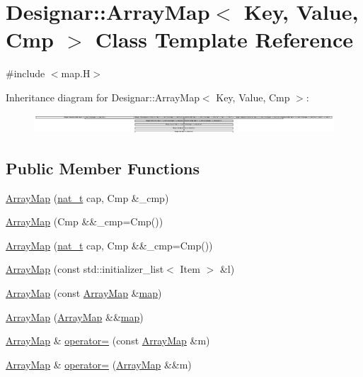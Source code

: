 \hypertarget{class_designar_1_1_array_map}{}\section{Designar\+:\+:Array\+Map$<$ Key, Value, Cmp $>$ Class Template Reference}
\label{class_designar_1_1_array_map}


{\ttfamily \#include $<$map.\+H$>$}

Inheritance diagram for Designar\+:\+:Array\+Map$<$ Key, Value, Cmp $>$\+:\begin{figure}[H]
\begin{center}
\leavevmode
\includegraphics[height=0.724638cm]{class_designar_1_1_array_map}
\end{center}
\end{figure}
\subsection*{Public Member Functions}
\begin{DoxyCompactItemize}
\item 
\hyperlink{class_designar_1_1_array_map_aa08404c6d0b6d40d7aefd04ccea24bc5}{Array\+Map} (\hyperlink{namespace_designar_aa72662848b9f4815e7bf31a7cf3e33d1}{nat\+\_\+t} cap, Cmp \&\+\_\+cmp)
\item 
\hyperlink{class_designar_1_1_array_map_ac7113b782b6ade75f5ccc843ecc2c153}{Array\+Map} (Cmp \&\&\+\_\+cmp=Cmp())
\item 
\hyperlink{class_designar_1_1_array_map_a553f96874d7e4037c333edd6dd76ba31}{Array\+Map} (\hyperlink{namespace_designar_aa72662848b9f4815e7bf31a7cf3e33d1}{nat\+\_\+t} cap, Cmp \&\&\+\_\+cmp=Cmp())
\item 
\hyperlink{class_designar_1_1_array_map_aea553306fead24dc02e06ea89146d4f0}{Array\+Map} (const std\+::initializer\+\_\+list$<$ Item $>$ \&l)
\item 
\hyperlink{class_designar_1_1_array_map_a47288ae6af2300316c32e55bf46f7713}{Array\+Map} (const \hyperlink{class_designar_1_1_array_map}{Array\+Map} \&\hyperlink{class_designar_1_1_container_algorithms_a3b9044a197e4ceec6a1de03de197a293}{map})
\item 
\hyperlink{class_designar_1_1_array_map_a86b665176315dedc19b78479a47aa810}{Array\+Map} (\hyperlink{class_designar_1_1_array_map}{Array\+Map} \&\&\hyperlink{class_designar_1_1_container_algorithms_a3b9044a197e4ceec6a1de03de197a293}{map})
\item 
\hyperlink{class_designar_1_1_array_map}{Array\+Map} \& \hyperlink{class_designar_1_1_array_map_acc6b11ade9bcae167fb939cc6eec6c6e}{operator=} (const \hyperlink{class_designar_1_1_array_map}{Array\+Map} \&m)
\item 
\hyperlink{class_designar_1_1_array_map}{Array\+Map} \& \hyperlink{class_designar_1_1_array_map_a2bc354ad6ea6eb8103a8bca14abdece2}{operator=} (\hyperlink{class_designar_1_1_array_map}{Array\+Map} \&\&m)
\end{DoxyCompactItemize}
